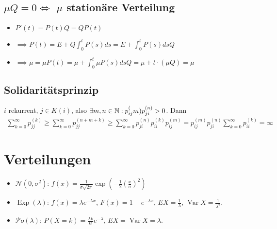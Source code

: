 \documentclass[a4paper,DIV15]{scrartcl}
\begin{document}
\subsection{$\mu Q = 0 \iff$ $\mu$ stationäre Verteilung}
\begin{itemize}
\item $P'(t) = P(t)Q = QP(t)$
\item $\implies P(t) = E + Q\int_0^t P(s)ds = E+\int_0^t P(s)ds Q$
\item $\implies \mu = \mu P(t) = \mu  + \int_0^t \mu P(s) ds Q = \mu  + t \cdot (\mu Q) = \mu$
\end{itemize}

\subsection{Solidaritätsprinzip}
$i$ rekurrent, $j\in K(i)$, also $\exists m,n\in\mathbb{N}: p_{ij}^(m)p_{ji}^{(n)} > 0$. Dann
\begin{align*}
\sum_{k=0}^\infty p_{jj}^{(k)} \ge \sum_{k=0}^\infty p_{jj}^{(n+m+k)}
\ge \sum_{k=0}^\infty p_{ji}^{(n)} p_{ii}^{(k)} p_{ij}^{(m)}
= p_{ij}^{(m)}p_{ji}^{(n)} \sum_{k=0}^\infty p_{ii}^{(k)} = \infty
\end{align*}

\section{Verteilungen}

\begin{itemize}
\item $\mathcal N(0,\sigma^2)$: $f(x) = \frac1{\sigma \sqrt{2\pi}} \exp(-\frac 12 (\frac x \sigma)^2)$
\item $\operatorname{Exp}(\lambda)$: $f(x) =\lambda e^{-\lambda x}$, $F(x)=1-e^{-\lambda x}$, $EX=\frac 1 \lambda$, $\operatorname{Var}X=\frac1{\lambda^2}$.
\item $\mathcal Po(\lambda)$: $P(X=k)=\frac{\lambda k}{k!} e^{-\lambda}$, $EX=\operatorname{Var}X=\lambda$.
\end{itemize}
\end{document}
